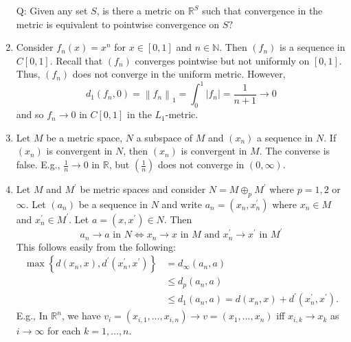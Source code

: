\documentclass[a4paper]{article}
\begin{document}
\begin{example}
\begin{enumerate}
        Q: Given any set $S$, is there a metric on $\mathbb{R}^{S}$ such that convergence in the metric is equivalent to pointwise convergence on $S ?$
        \item Consider $f_{n}(x)=x^{n}$ for $x \in[0,1]$ and $n \in \mathbb{N}$. Then $\left(f_{n}\right)$ is a sequence in $C[0,1]$. Recall that $\left(f_{n}\right)$ converges pointwise but not uniformly on $[0,1]$. Thus, $\left(f_{n}\right)$ does not converge in the uniform metric. However,
        \[
        d_{1}\left(f_{n}, 0\right)=\left\|f_{n}\right\|_{1}=\int_{0}^{1}\left|f_{n}\right|=\frac{1}{n+1} \rightarrow 0
        \]
        and so $f_{n} \rightarrow 0$ in $C[0,1]$ in the $L_{1}$-metric.
        \item Let $M$ be a metric space, $N$ a subspace of $M$ and $\left(x_{n}\right)$ a sequence in $N$. If $\left(x_{n}\right)$ is convergent in $N$, then $\left(x_{n}\right)$ is convergent in $M$. The converse is false. E.g., $\frac{1}{n} \rightarrow 0$ in $\mathbb{R}$, but $\left(\frac{1}{n}\right)$ does not converge in $(0, \infty)$.
        \item Let $M$ and $M^{\prime}$ be metric spaces and consider $N=M \oplus_{p} M^{\prime}$ where $p=1,2$ or $\infty$. Let $\left(a_{n}\right)$ be a sequence in $N$ and write $a_{n}=\left(x_{n}, x_{n}^{\prime}\right)$ where $x_{n} \in M$ and $x_{n}^{\prime} \in M^{\prime} .$ Let $a=\left(x, x^{\prime}\right) \in N$. Then
        \[
        a_{n} \rightarrow a \text { in } N \Longleftrightarrow x_{n} \rightarrow x \text { in } M \text { and } x_{n}^{\prime} \rightarrow x^{\prime} \text { in } M^{\prime}
        \]
        This follows easily from the following:
        \[
        \begin{aligned}
        \max \left\{d\left(x_{n}, x\right), d^{\prime}\left(x_{n}^{\prime}, x^{\prime}\right)\right\}&=d_{\infty}\left(a_{n}, a\right) \\
        &\le d_{p}\left(a_{n}, a\right) \\
        & \leqslant d_{1}\left(a_{n}, a\right)=d\left(x_{n}, x\right)+d^{\prime}\left(x_{n}^{\prime}, x^{\prime}\right).
        \end{aligned}
        \]
        E.g., In $\mathbb{R}^{n}$, we have $v_{i}=\left(x_{i, 1}, \ldots, x_{i, n}\right) \rightarrow v=\left(x_{1}, \ldots, x_{n}\right)$ iff $x_{i, k} \rightarrow x_{k}$ as $i \rightarrow \infty$ for each $k=1, \ldots, n$.
    \end{enumerate}
\end{example}
\end{document}
